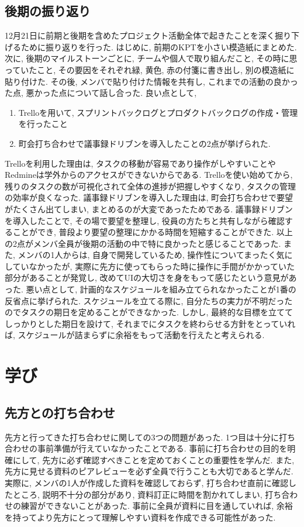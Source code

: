 \section{後期の振り返り}
12月21日に前期と後期を含めたプロジェクト活動全体で起きたことを深く掘り下げるために振り返りを行った. はじめに, 前期のKPTを小さい模造紙にまとめた.
次に, 後期のマイルストーンごとに, チームや個人で取り組んだこと, その時に思っていたこと, その要因をそれぞれ緑, 黄色, 赤の付箋に書き出し, 別の模造紙に貼り付けた.
その後, メンバで貼り付けた情報を共有し, これまでの活動の良かった点, 悪かった点について話し合った. 良い点として,
\begin{enumerate}
    \item Trelloを用いて, スプリントバックログとプロダクトバックログの作成・管理を行ったこと
    \item 町会打ち合わせで議事録ドリブンを導入したことの2点が挙げられた.
\end{enumerate}
Trelloを利用した理由は, タスクの移動が容易であり操作がしやすいことやRedmineは学外からのアクセスができないからである.
Trelloを使い始めてから, 残りのタスクの数が可視化されて全体の進捗が把握しやすくなり, タスクの管理の効率が良くなった. 議事録ドリブンを導入した理由は, 町会打ち合わせで要望がたくさん出てしまい,
まとめるのが大変であったためである. 議事録ドリブンを導入したことで, その場で要望を整理し, 役員の方たちと共有しながら確認することができ, 普段より要望の整理にかかる時間を短縮することができた.
以上の2点がメンバ全員が後期の活動の中で特に良かったと感じることであった. また, メンバの1人からは, 自身で開発しているため, 操作性についてまったく気にしていなかったが,
実際に先方に使ってもらった時に操作に手間がかかっていた部分があることが発覚し, 改めてUIの大切さを身をもって感じたという意見があった.
悪い点として, 計画的なスケジュールを組み立てられなかったことが1番の反省点に挙げられた. スケジュールを立てる際に, 自分たちの実力が不明だったのでタスクの期日を定めることができなかった.
しかし, 最終的な目標を立ててしっかりとした期日を設けて, それまでにタスクを終わらせる方針をとっていれば, スケジュールが詰まらずに余裕をもって活動を行えたと考えられる.

\chapter{学び}
\section{先方との打ち合わせ}
先方と行ってきた打ち合わせに関しての3つの問題があった.
1つ目は十分に打ち合わせの事前準備が行えていなかったことである. 事前に打ち合わせの目的を明確にして, 先方に必ず確認すべきことを定めておくことの重要性を学んだ.
また, 先方に見せる資料のピアレビューを必ず全員で行うことも大切であると学んだ. 実際に, メンバの1人が作成した資料を確認しておらず, 打ち合わせ直前に確認したところ, 説明不十分の部分があり,
資料訂正に時間を割かれてしまい, 打ち合わせの練習ができないことがあった. 事前に全員が資料に目を通していれば, 余裕を持ってより先方にとって理解しやすい資料を作成できる可能性があった.

